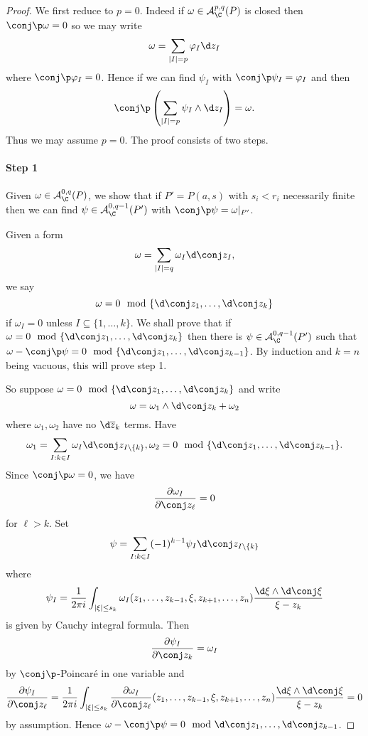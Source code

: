 \documentclass[a4paper]{article}
\newcommand{\w}{\wedge} %
\begin{document}
\begin{proof}
  We first reduce to \(p = 0\). Indeed if \(\omega \in \mathcal A_\C^{p, q}(P)\) is closed then \(\conj \p \omega = 0\) so we may write
  \[
    \omega = \sum_{|I| = p} \varphi_I \d z_I
  \]
  where \(\conj \p \varphi_I = 0\). Hence if we can find \(\psi_I\) with \(\conj \p \psi_I = \varphi_I\) and then
  \[
    \conj \p \left(\sum_{|I| = p} \psi_I \w \d z_I\right) = \omega.
  \]
  Thus we may assume \(p = 0\). The proof consists of two steps.

  \paragraph{Step 1}

  Given \(\omega \in \mathcal A_\C^{0, q}(P)\), we show that if \(P' = P(a, s)\) with \(s_i < r_i\) necessarily finite then we can find \(\psi \in \mathcal A_\C^{0, q - 1}(P')\) with \(\conj \p \psi = \omega|_{P'}\).

  Given a form
  \[
    \omega = \sum_{|I| = q} \omega_I \d  \conj z_I,
  \]
  we say
  \[
    \omega = 0 \mod \{\d \conj z_1, \dots, \d \conj z_k\}
  \]
  if \(\omega_I = 0\) unless \(I \subseteq \{1, \dots, k\}\). We shall prove that if \(\omega = 0 \mod \{\d \conj z_1, \dots, \d \conj z_k\}\) then there is \(\psi \in \mathcal A_\C^{0, q - 1}(P')\) such that \(\omega - \conj \p \psi = 0 \mod \{\d \conj z_1, \dots, \d \conj z_{k - 1}\}\). By induction and \(k = n\) being vacuous, this will prove step 1.

  So suppose \(\omega = 0 \mod \{\d \conj z_1, \dots, \d \conj z_k\}\) and write
  \[
    \omega = \omega_1 \w \d \conj z_k + \omega_2
  \]
  where \(\omega_1, \omega_2\) have no \(\d \overline z_k\) terms. Have
  \[
    \omega_1 = \sum_{I: k \in I} \omega_I \d  \conj z_{I \setminus \{k\}}, \omega_2 = 0 \mod \{\d \conj z_1, \dots, \d \conj z_{k - 1}\}.
  \]
  Since \(\conj \p \omega = 0\), we have
  \[
    \frac{\partial \omega_I}{\partial \conj z_\ell} = 0
  \]
  for \(\ell > k\). Set
  \[
    \psi = \sum_{I: k \in I} (-1)^{k - 1} \psi_I \d \conj z_{I \setminus \{k\}}
  \]
  where
  \[
    \psi_I = \frac{1}{2\pi i} \int_{|\xi| \leq s_k} \omega_I(z_1, \dots, z_{k - 1}, \xi, z_{k + 1}, \dots, z_n) \frac{\d  \xi \w \d  \conj \xi}{\xi - z_k}
  \]
  is given by Cauchy integral formula. Then
  \[
    \frac{\partial \psi_I}{\partial \conj z_k} = \omega_I
  \]
  by \(\conj \p\)-Poincaré in one variable and
 \[
   \frac{\partial \psi_I}{\partial \conj z_\ell} = \frac{1}{2\pi i} \int_{|\xi| \leq s_k} \frac{\partial \omega_I}{\partial \conj z_\ell} (z_1, \dots, z_{k - 1}, \xi, z_{k + 1}, \dots, z_n) \frac{\d  \xi \w \d  \conj \xi}{\xi - z_k}
   = 0
 \]
 by assumption. Hence \(\omega - \conj \p \psi = 0 \mod \d \conj z_1, \dots, \d \conj z_{k - 1}\).
  

\end{proof}
\end{document}
